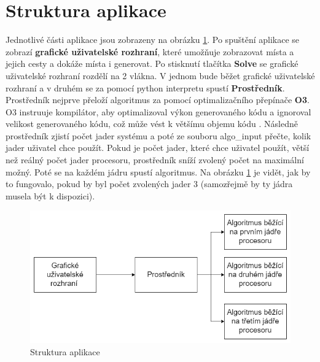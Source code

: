 \section{Struktura aplikace}
Jednotlivé části aplikace jsou zobrazeny na obrázku \ref{fig:struktura ap}. Po spuštění aplikace se zobrazí \textbf{grafické uživatelské rozhraní}, které umožňuje zobrazovat místa a jejich cesty a dokáže místa i generovat. Po stisknutí tlačítka \textbf{Solve} se grafické uživatelské rozhraní rozdělí na 2 vlákna. V jednom bude běžet grafické uživatelské rozhraní a v druhém se za pomocí python interpretu spustí \textbf{Prostředník}. Prostředník nejprve přeloží algoritmus za pomocí optimalizačního přepínače \textbf{O3}. O3 instruuje kompilátor, aby optimalizoval výkon generovaného kódu a ignoroval velikost generovaného kódu, což může vést k většímu objemu kódu \cite{ARMOptimization}. Následně prostředník zjistí počet jader systému a poté ze souboru algo\_input přečte, kolik jader uživatel chce použít. Pokud je počet jader, které chce uživatel použít, větší než reálný počet jader procesoru, prostředník sníží zvolený počet na maximální možný. Poté se na každém jádru spustí algoritmus. Na obrázku \ref{fig:struktura ap} je vidět, jak by to fungovalo, pokud by byl počet zvolených jader 3 (samozřejmě by ty jádra musela být k dispozici).
\begin{figure}[H]
\includegraphics[width=15cm]{obrazky-figures/struktura_ap.png}
\caption{Struktura aplikace}
\label{fig:struktura ap}
\end{figure}


